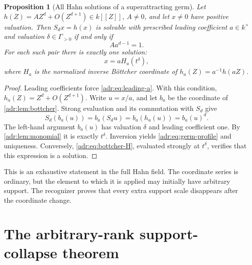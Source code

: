 \documentclass[11pt,letterpaper]{article}
\numberwithin{equation}{section}
\newtheorem{proposition}[proposition]{Proposition}
\theoremstyle{definition}
\theoremstyle{remark}
\begin{document}
\begin{proposition}[All Hahn solutions of a superattracting germ]
\label{adr:prop:germ}
Let $h(Z)=A Z^d+O(Z^{d+1})\in k[[Z]]$, $A\ne0$, and let $x\ne0$
have positive valuation. Then $S_dx=h(x)$ is solvable with prescribed
leading coefficient $a\in k^\times$ and valuation $\delta\in\Gamma_{>0}$
if and only if
\begin{equation}\label{adr:eq:leading-a}
 A a^{d-1}=1.
\end{equation}
For each such pair there is exactly one solution:
\begin{equation}\label{adr:eq:germ-profile}
 x=aH_a(t^\delta),
\end{equation}
where $H_a$ is the normalized inverse B\"ottcher coordinate of
$h_a(Z)=a^{-1}h(aZ)$.
\end{proposition}
\begin{proof}
Leading coefficients force \eqref{adr:eq:leading-a}. With this condition,
$h_a(Z)=Z^d+O(Z^{d+1})$. Write $u=x/a$, and let $b_a$ be the coordinate
of \cref{adr:lem:bottcher}. Strong evaluation and its commutation with $S_d$
give
\[
 S_d(b_a(u))=b_a(S_du)=b_a(h_a(u))=b_a(u)^d.
\]
The left-hand argument $b_a(u)$ has valuation $\delta$ and leading
coefficient one. By \cref{adr:lem:monomial} it is exactly $t^\delta$.
Inversion yields \eqref{adr:eq:germ-profile} and uniqueness. Conversely,
\eqref{adr:eq:bottcher-H}, evaluated strongly at $t^\delta$, verifies that
this expression is a solution.
\end{proof}

This is an exhaustive statement in the full Hahn field. The coordinate
series is ordinary, but the element to which it is applied may initially
have arbitrary support. The recognizer proves that every extra support
scale disappears after the coordinate change.

\section{The arbitrary-rank support-collapse theorem}\label{adr:sec:main}
\end{document}
